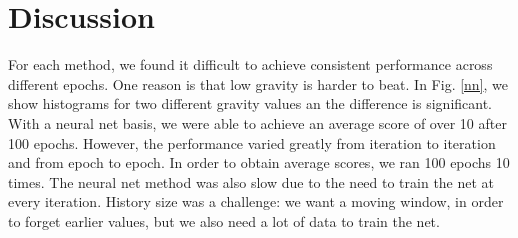 \documentclass[11pt]{article}
\begin{document}
\section{Discussion} 
For each method, we found it difficult to achieve consistent performance across different epochs. One reason is that low gravity is harder to beat. In Fig. \ref{nn}, we show histograms for two different gravity values an the difference is significant.
\\With a neural net basis, we were able to achieve an average score of over 10 after 100 epochs. However, the performance varied greatly from iteration to iteration and from epoch to epoch. In order to obtain average scores, we ran 100 epochs 10 times. The neural net method was also slow due to the need to train the net at every iteration. History size was a challenge: we want a moving window, in order to forget earlier values, but we also need a lot of data to train the net. 
\end{document}
